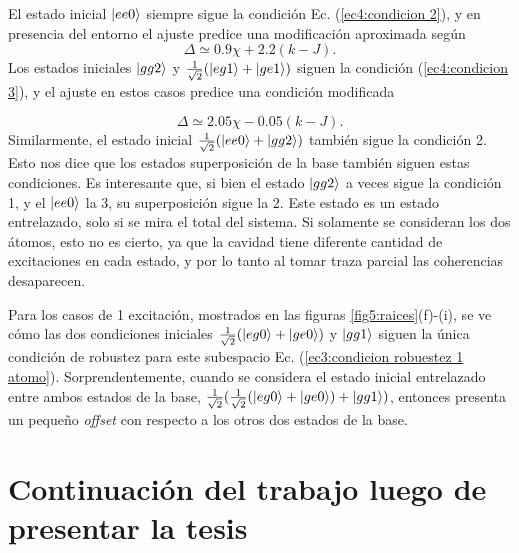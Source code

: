 El estado inicial $\ket{ee0}$ siempre sigue la condición Ec. (\ref{ec4:condicion 2}), y en presencia del entorno el ajuste predice una modificación aproximada según
\begin{equation}
    \Delta\simeq0.9\chi+2.2(k-J).
    \label{ec5:condicion 2 modificada}
\end{equation}
Los estados iniciales $\ket{gg2}$ y $\frac{1}{\sqrt{2}}(\ket{eg1}+\ket{ge1})$ siguen la condición (\ref{ec4:condicion 3}), y el ajuste en estos casos predice una condición modificada

\begin{equation}
    \Delta\simeq2.05\chi-0.05(k-J).
    \label{ec5:condicion 3 modificada}
\end{equation}
Similarmente, el estado inicial $\frac{1}{\sqrt{2}}(\ket{ee0}+\ket{gg2})$ también sigue la condición 2. Esto nos dice que los estados superposición de la base también siguen estas condiciones. Es interesante que, si bien el estado $\ket{gg2}$ a veces sigue la condición 1, y el $\ket{ee0}$ la 3, su superposición sigue la 2. Este estado es un estado entrelazado, solo si se mira el total del sistema. Si solamente se consideran los dos átomos, esto no es cierto, ya que la cavidad tiene diferente cantidad de excitaciones en cada estado, y por lo tanto al tomar traza parcial las coherencias desaparecen. 

Para los casos de 1 excitación, mostrados en las figuras \ref{fig5:raices}(f)-(i), se ve cómo las dos condiciones iniciales $\frac{1}{\sqrt{2}}(\ket{eg0}+\ket{ge0})$ y $\ket{gg1}$ siguen la única condición de robustez para este subespacio Ec. (\ref{ec3:condicion robuestez 1 atomo}). Sorprendentemente, cuando se considera el estado inicial entrelazado entre ambos estados de la base, $\frac{1}{\sqrt{2}}(\frac{1}{\sqrt{2}}(\ket{eg0}+\ket{ge0})+\ket{gg1})$, entonces presenta un pequeño \textit{offset} con respecto a los otros dos estados de la base. 



\section{Continuación del trabajo luego de presentar la tesis}


